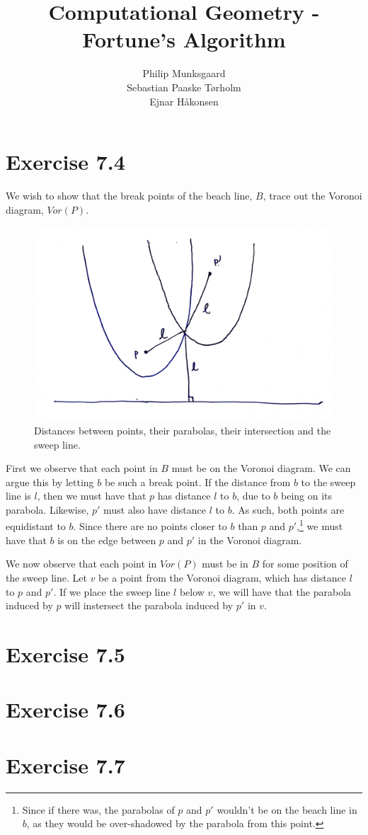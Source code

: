 \documentclass[11pt,a4paper]{article}
\title{Computational Geometry - Fortune's Algorithm}
\author{Philip Munksgaard \\ Sebastian Paaske Tørholm \\ Ejnar Håkonsen}
\begin{document}
\maketitle

\section{Exercise 7.4}
We wish to show that the break points of the beach line, $B$, trace out the Voronoi diagram, $Vor(P)$.

\begin{figure}[h!]
    \centering
    \includegraphics[width=.7\textwidth]{ex74-diagram.jpg}
    \caption{Distances between points, their parabolas, their intersection and the sweep line.}
    \label{ex74:dist}
\end{figure}

First we observe that each point in $B$ must be on the Voronoi diagram. We can
argue this by letting $b$ be such a break point. If the distance from $b$ to
the sweep line is $l$, then we must have that $p$ has distance $l$ to $b$, due
to $b$ being on its parabola. Likewise, $p'$ must also have distance $l$ to
$b$. As such, both points are equidistant to $b$. Since there are no
points closer to $b$ than $p$ and $p'$,\footnote{Since if there was, the
parabolas of $p$ and $p'$ wouldn't be on the beach line in $b$, as they would
be over-shadowed by the parabola from this point.}
we must have that $b$ is on the edge between $p$ and $p'$ in the Voronoi diagram.

We now observe that each point in $Vor(P)$ must be in $B$ for some position
of the sweep line. Let $v$ be a point from the Voronoi diagram, which has
distance $l$ to $p$ and $p'$. If we place the sweep line $l$ below $v$, we
will have that the parabola induced by $p$ will instersect the parabola
induced by $p'$ in $v$.

\section{Exercise 7.5}


\section{Exercise 7.6}


\section{Exercise 7.7}
\end{document}
